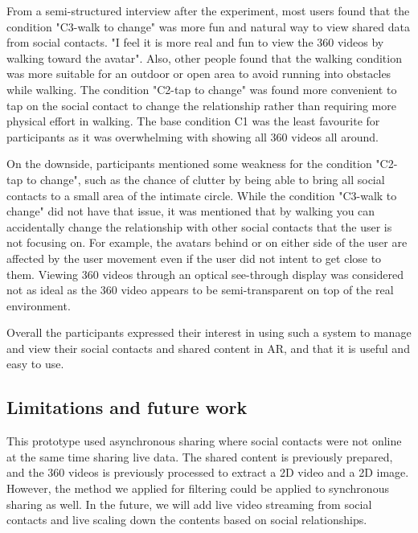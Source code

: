 From a semi-structured interview after the experiment, most users found that the condition "C3-walk to change" was more fun and natural way to view shared data from social contacts. "I feel it is more real and fun to view the 360 videos by walking toward the avatar". Also, other people found that the walking condition was more suitable for an outdoor or open area to avoid running into obstacles while walking. The condition "C2-tap to change" was found more convenient to tap on the social contact to change the relationship rather than requiring more physical effort in walking. The base condition C1 was the least favourite for participants as it was overwhelming with showing all 360 videos all around. 

On the downside, participants mentioned some weakness for the condition "C2-tap to change", such as the chance of clutter by being able to bring all social contacts to a small area of the intimate circle. While the condition "C3-walk to change" did not have that issue, it was mentioned that by walking you can accidentally change the relationship with other social contacts that the user is not focusing on. For example, the avatars behind or on either side of the user are affected by the user movement even if the user did not intent to get close to them. Viewing 360 videos through an optical see-through display was considered not as ideal as the 360 video appears to be semi-transparent on top of the real environment.

Overall the participants expressed their interest in using such a system to manage and view their social contacts and shared content in AR, and that it is useful and easy to use. 

\subsection{Limitations and future work}

This prototype used asynchronous sharing where social contacts were not online at the same time sharing live data. The shared content is previously prepared, and the 360 videos is previously processed to extract a 2D video and a 2D image. However, the method we applied for filtering could be applied to synchronous sharing as well. In the future, we will add live video streaming from social contacts and live scaling down the contents based on social relationships. 

